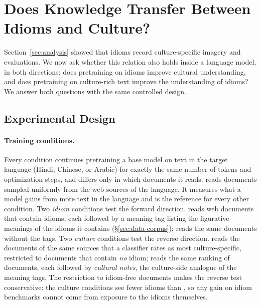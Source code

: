 \section{Does Knowledge Transfer Between Idioms and Culture?}
\label{sec:experiments}

Section~\ref{sec:analysis} showed that idioms record culture-specific imagery and evaluations. We now ask whether this relation also holds inside a language model, in both directions: does pretraining on idioms improve cultural understanding, and does pretraining on culture-rich text improve the understanding of idioms? We answer both questions with the same controlled design.

\subsection{Experimental Design}
\label{sec:setup}

\paragraph{Training conditions.}
Every condition continues pretraining a base model on text in the target language (Hindi, Chinese, or Arabic) for exactly the same number of tokens and optimization steps, and differs only in which documents it reads.
\textbf{\random{}} reads documents sampled uniformly from the web sources of the language. It measures what a model gains from more text in the language and is the reference for every other condition.
Two \textit{idiom} conditions test the forward direction. \textbf{\idiomcpt{}} reads web documents that contain \dataname{} idioms, each followed by a meaning tag listing the figurative meanings of the idioms it contains (\S\ref{sec:data-corpus}); \textbf{\idiomdocs{}} reads the same documents without the tags.
Two \textit{culture} conditions test the reverse direction. \textbf{\culturecpt{}} reads the documents of the same sources that a classifier rates as most culture-specific, restricted to documents that contain \emph{no} \dataname{} idiom; \textbf{\culturenotes{}} reads the same ranking of documents, each followed by \textit{cultural notes}, the culture-side analogue of the meaning tags.
The restriction to idiom-free documents makes the reverse test conservative: the culture conditions see fewer idioms than \random{}, so any gain on idiom benchmarks cannot come from exposure to the idioms themselves.

